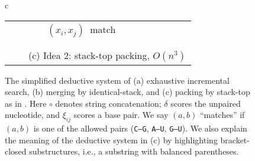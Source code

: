 \begin{figure}[h]
{\begin{tabular}{c}
\begin{tabular}{lll}
{\pop} & \inferrule{\nitemt{k}{i}{\bml\codeblue{$\alpha$},s'} \quad \nitemt{i}{j}{\bml\codeblue{$\beta$},s}}
                           {\nitemt{k}{j\!+\!1}{\bml\codeblue{$\alpha\ml\beta\mr$} ,s'+s+\xi_{ij}}} 
         & $~(x_i, x_j)~$ match 
  \\ [0.2in]
              & \\
                & \\
  \multicolumn{3}{c}{~~~~(c) Idea 2: stack-top packing, $O(n^3)$}
\end{tabular}
\end{tabular}
  }
\caption{The simplified deductive system of (a) exhaustive incremental search,
  (b) merging by identical-stack, and (c) packing by stack-top as in \linearfold.
  Here $\circ$ denotes string concatenation; $\delta$ scores the unpaired
  nucleotide, and $\xi_{ij}$ scores a base pair. 
We say $(a, b)$ ``matches'' if $(a,b)$ is one of the allowed pairs ({\tt C--G}, {\tt A--U}, {\tt G--U}).
We also explain the meaning of the deductive system in (c) by highlighting bracket-closed substructures,
i.e., a substring with balanced parentheses. %
\label{fig:deduction}}
\end{figure}

